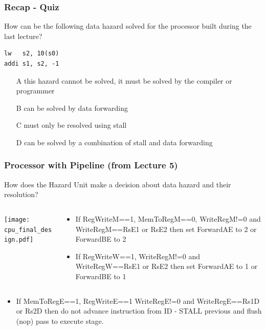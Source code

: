 \documentclass{beamer}
\begin{document}
\begin{frame}[fragile]
\frametitle{Recap - Quiz}

How can be the following data hazard solved for the processor built during the last lecture?
\medskip
\begin{verbatim}
lw   s2, 10(s0)
addi s1, s2, -1
\end{verbatim}
\bigskip
\begin{itemize}
 \item[A] this hazard cannot be solved, it must be solved by the compiler or programmer
 \item[B] can be solved by data forwarding
 \item[C] must only be resolved using stall
 \item[D] can be solved by a combination of stall and data forwarding
\end{itemize}

\end{frame}


\begin{frame}

\frametitle{Processor with Pipeline (from Lecture 5)}

How does the Hazard Unit make a decision about data hazard and their resolution?
\begin{columns}
\begin{column}{0.67\textwidth}
\texttt{[image: cpu\_final\_design.pdf]}
\end{column}
\begin{column}{0.33\textwidth}
\footnotesize
\begin{itemize}
\item If RegWriteM==1, MemToRegM==0, WriteRegM!=0 and WriteRegM==RsE1 or RsE2 then set ForwardAE to 2 or ForwardBE to 2
\item If RegWriteW==1, WriteRegM!=0 and WriteRegW==RsE1 or RsE2 then set ForwardAE to 1 or ForwardBE to 1
\end{itemize}
\end{column}
\end{columns}
\bigskip
\footnotesize
\begin{itemize}
\item If MemToRegE==1, RegWriteE==1 WriteRegE!=0 and WriteRegE==Rs1D or Rs2D then do not advance instruction from ID - STALL previous and flush (nop) pass to execute stage.
\end{itemize}
\end{frame}
\end{document}
